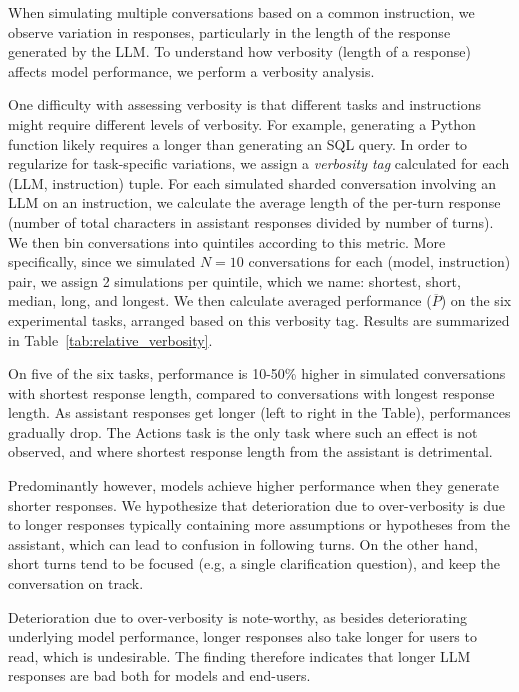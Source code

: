 \documentclass{article}
\begin{document}
\begin{appendices}
When simulating multiple conversations based on a common instruction, we observe variation in responses, particularly in the length of the response generated by the LLM. To understand how verbosity (length of a response) affects model performance, we perform a verbosity analysis.

One difficulty with assessing verbosity is that different tasks and instructions might require different levels of verbosity. For example, generating a Python function likely requires a longer than generating an SQL query. In order to regularize for task-specific variations, we assign a \textit{verbosity tag} calculated for each (LLM, instruction) tuple. For each simulated sharded conversation involving an LLM on an instruction, we calculate the average length of the per-turn response (number of total characters in assistant responses divided by number of turns). We then bin conversations into quintiles according to this metric. More specifically, since we simulated $N=10$ conversations for each (model, instruction) pair, we assign 2 simulations per quintile, which we name: shortest, short, median, long, and longest. We then calculate averaged performance ($\overline{P}$) on the six experimental tasks, arranged based on this verbosity tag. Results are summarized in Table~\ref{tab:relative_verbosity}.

On five of the six tasks, performance is 10-50\% higher in simulated conversations with shortest response length, compared to conversations with longest response length. As assistant responses get longer (left to right in the Table), performances gradually drop. The Actions task is the only task where such an effect is not observed, and where shortest response length from the assistant is detrimental.

Predominantly however, models achieve higher performance when they generate shorter responses. We hypothesize that deterioration due to over-verbosity is due to longer responses typically containing more assumptions or hypotheses from the assistant, which can lead to confusion in following turns. On the other hand, short turns tend to be focused (e.g,  a single clarification question), and keep the conversation on track.

Deterioration due to over-verbosity is note-worthy, as besides deteriorating underlying model performance, longer responses also take longer for users to read, which is undesirable. The finding therefore indicates that longer LLM responses are bad both for models and end-users.


\end{appendices}
\end{document}
